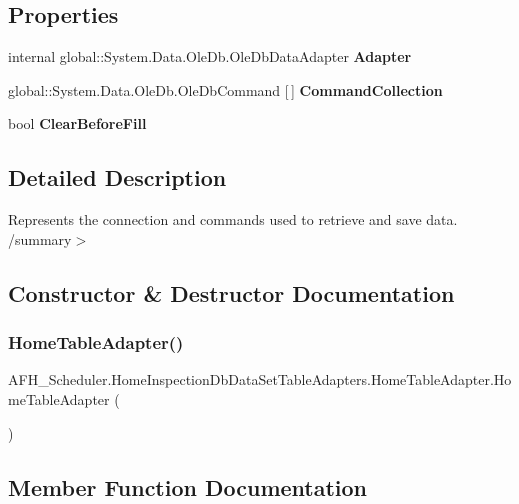 \subsection*{Properties}
\begin{DoxyCompactItemize}
\item 
internal global\+::\+System.\+Data.\+Ole\+Db.\+Ole\+Db\+Data\+Adapter \textbf{ Adapter}\hspace{0.3cm}{\ttfamily  [get]}
\item 
global\+::\+System.\+Data.\+Ole\+Db.\+Ole\+Db\+Command [$\,$] \textbf{ Command\+Collection}\hspace{0.3cm}{\ttfamily  [get]}
\item 
bool \textbf{ Clear\+Before\+Fill}\hspace{0.3cm}{\ttfamily  [get, set]}
\end{DoxyCompactItemize}


\subsection{Detailed Description}
Represents the connection and commands used to retrieve and save data. /summary$>$ 

\subsection{Constructor \& Destructor Documentation}
\mbox{\label{class_a_f_h___scheduler_1_1_home_inspection_db_data_set_table_adapters_1_1_home_table_adapter_a590986fe1dd9cb015995d94b5bf61f45}} 
\subsubsection{HomeTableAdapter()}
{\footnotesize\ttfamily A\+F\+H\+\_\+\+Scheduler.\+Home\+Inspection\+Db\+Data\+Set\+Table\+Adapters.\+Home\+Table\+Adapter.\+Home\+Table\+Adapter (\begin{DoxyParamCaption}{ }\end{DoxyParamCaption})}



\subsection{Member Function Documentation}
\mbox{\label{class_a_f_h___scheduler_1_1_home_inspection_db_data_set_table_adapters_1_1_home_table_adapter_a954c0389819b750cd9025f42634eba6b}} 
